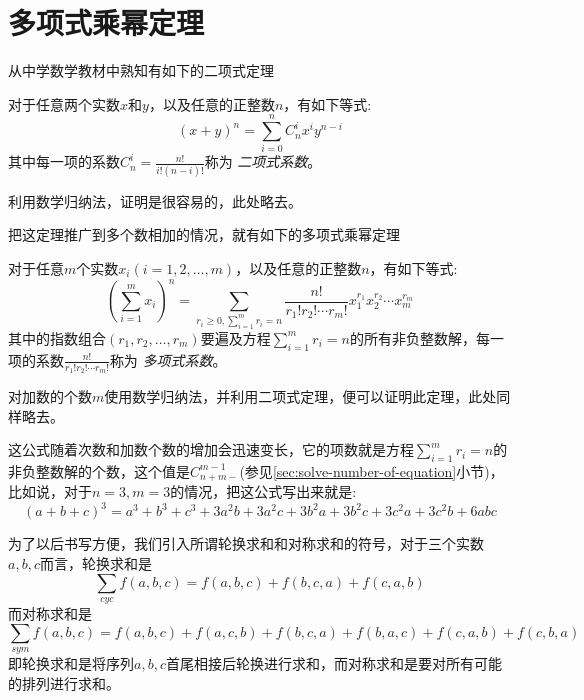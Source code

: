 
\section{多项式乘幂定理}
\label{sec:polynomial-theorem}

从中学数学教材中熟知有如下的二项式定理
\begin{theorem}[二项式定理]
  对于任意两个实数$x$和$y$，以及任意的正整数$n$，有如下等式:
  \begin{equation}
    \label{eq:binomial-theorem}
    (x+y)^n = \sum_{i=0}^n C_n^i x^iy^{n-i}
  \end{equation}
  其中每一项的系数$C_n^i=\frac{n!}{i!(n-i)!}$称为 \emph{二项式系数}。
\end{theorem}

利用数学归纳法，证明是很容易的，此处略去。

把这定理推广到多个数相加的情况，就有如下的多项式乘幂定理
\begin{theorem}[多项式乘幂定理]
  对于任意$m$个实数$x_i(i=1,2,\ldots,m)$，以及任意的正整数$n$，有如下等式:
  \begin{equation}
    \label{eq:polynomial-theorem}
    \left( \sum_{i=1}^m x_i \right)^n = \sum_{r_{i} \geqslant 0,\sum_{i=1}^{m}r_{i}=n} \frac{n!}{r_1!r_2!\cdots r_m!}x_1^{r_1}x_2^{r_2}\cdots x_m^{r_m}
  \end{equation}
  其中的指数组合$(r_1,r_2,\ldots,r_{m})$要遍及方程$\sum_{i=1}^{m}r_{i}=n$的所有非负整数解，每一项的系数$\frac{n!}{r_1!r_{2}!\cdots r_{m}!}$称为 \emph{多项式系数}。
\end{theorem}

对加数的个数$m$使用数学归纳法，并利用二项式定理，便可以证明此定理，此处同样略去。

这公式随着次数和加数个数的增加会迅速变长，它的项数就是方程$\sum_{i=1}^mr_i=n$的非负整数解的个数，这个值是$C_{n+m-}^{m-1}$(参见\ref{sec:solve-number-of-equation}小节)，比如说，对于$n=3,m=3$的情况，把这公式写出来就是:
\begin{equation*}
  (a+b+c)^3 = a^3+b^3+c^3+3a^2b+3a^2c+3b^2a+3b^2c+3c^2a+3c^2b+6abc
\end{equation*}

为了以后书写方便，我们引入所谓轮换求和和对称求和的符号，对于三个实数$a,b,c$而言，轮换求和是
\begin{equation*}
  \sum_{cyc} f(a,b,c) = f(a,b,c) + f(b, c, a) + f(c, a ,b)
\end{equation*}
而对称求和是
\begin{equation*}
  \sum_{sym} f(a,b,c) = f(a, b, c) + f(a, c, b) + f(b, c, a) + f(b, a, c) + f(c, a, b) + f(c, b, a)
\end{equation*}
即轮换求和是将序列$a,b,c$首尾相接后轮换进行求和，而对称求和是要对所有可能的排列进行求和。

